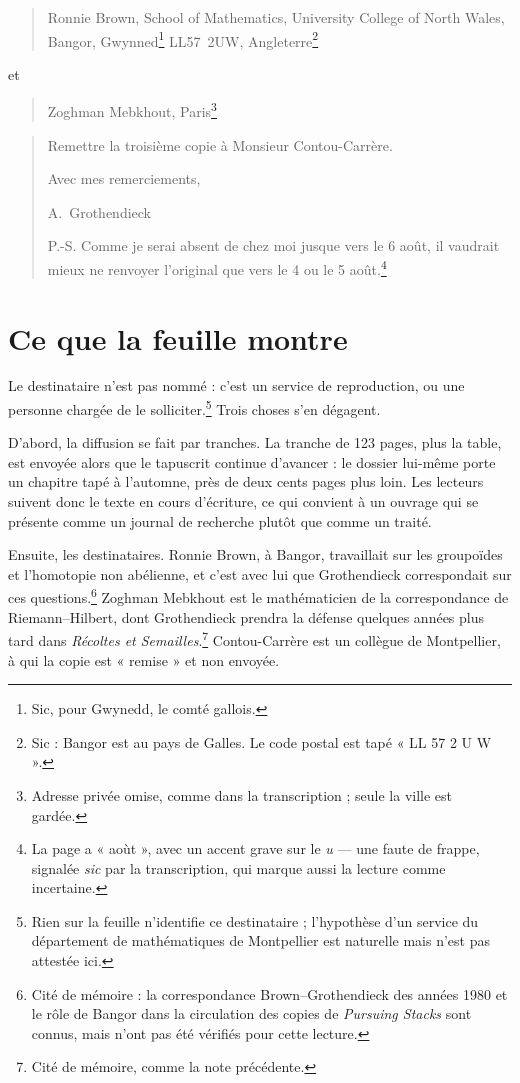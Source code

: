 \documentclass[11pt,a4paper]{article}
\begin{document}
\begin{quote}
Ronnie Brown, School of Mathematics, University College of North Wales,
Bangor, Gwynned\footnote{Sic, pour Gwynedd, le comté gallois.} LL57~2UW,
Angleterre\footnote{Sic : Bangor est au pays de Galles. Le code postal est
tapé « LL 57 2 U W ».}
\end{quote}

et

\begin{quote}
Zoghman Mebkhout, Paris\footnote{Adresse privée omise, comme dans la
transcription ; seule la ville est gardée.}
\end{quote}

\begin{quote}
Remettre la troisième copie à Monsieur Contou-Carrère.

Avec mes remerciements,

A.~Grothendieck

P.-S. Comme je serai absent de chez moi jusque vers le 6 août, il vaudrait
mieux ne renvoyer l'original que vers le 4 ou le 5 août.\footnote{La page a
« aoùt », avec un accent grave sur le \emph{u} --- une faute de frappe,
signalée \emph{sic} par la transcription, qui marque aussi la lecture comme
incertaine.}
\end{quote}

\section*{Ce que la feuille montre}

Le destinataire n'est pas nommé : c'est un service de reproduction, ou une
personne chargée de le solliciter.\footnote{Rien sur la feuille n'identifie ce
destinataire ; l'hypothèse d'un service du département de mathématiques de
Montpellier est naturelle mais n'est pas attestée ici.} Trois choses s'en
dégagent.

D'abord, la diffusion se fait par tranches. La tranche de 123 pages, plus la
table, est envoyée alors que le tapuscrit continue d'avancer : le dossier
lui-même porte un chapitre tapé à l'automne, près de deux cents pages plus
loin. Les
lecteurs suivent donc le texte en cours d'écriture, ce qui convient à un
ouvrage qui se présente comme un journal de recherche plutôt que comme un
traité.

Ensuite, les destinataires. Ronnie Brown, à Bangor, travaillait sur les
groupoïdes et l'homotopie non abélienne, et c'est avec lui que Grothendieck
correspondait sur ces questions.\footnote{Cité de mémoire : la
correspondance Brown--Grothendieck des années 1980 et le rôle de Bangor dans
la circulation des copies de \emph{Pursuing Stacks} sont connus, mais n'ont pas
été vérifiés pour cette lecture.} Zoghman Mebkhout est le mathématicien de la
correspondance de Riemann--Hilbert, dont Grothendieck prendra la défense
quelques années plus tard dans \emph{Récoltes et Semailles}.\footnote{Cité de
mémoire, comme la note précédente.} Contou-Carrère est un collègue de
Montpellier, à qui la copie est « remise » et non envoyée.
\end{document}
